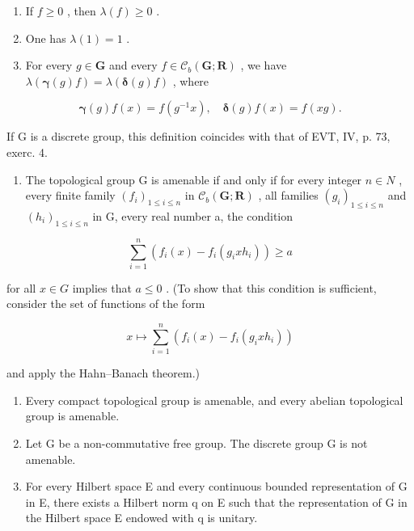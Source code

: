 \begin{enumerate}
\def\labelenumi{(\roman{enumi})}
\item
  If \(f \geqslant 0\) , then \(\lambda(f) \geqslant 0\) .
\item
  One has \(\lambda(1)=1\) .
\item
  For every \(g \in \mathbf{G}\) and every \(f \in \mathcal{C}_b(\mathbf{G};\mathbf{R})\) , we have \(\lambda(\boldsymbol{\gamma}(g)f) = \lambda(\boldsymbol{\delta}(g)f)\) , where
\end{enumerate}

\[
\boldsymbol {\gamma} (g) f (x) = f \left(g ^ {- 1} x\right), \quad \boldsymbol {\delta} (g) f (x) = f (x g).
\]

If G is a discrete group, this definition coincides with that of EVT, IV, p. 73, exerc. 4.

\begin{enumerate}
\def\labelenumi{\alph{enumi})}
\tightlist
\item
  The topological group G is amenable if and only if for every integer \(n \in N\) , every finite family \((f_i)_{1 \leqslant i \leqslant n}\) in \(\mathcal{C}_b(\mathbf{G}; \mathbf{R})\) , all families \((g_i)_{1 \leqslant i \leqslant n}\) and \((h_i)_{1 \leqslant i \leqslant n}\) in G, every real number a, the condition
\end{enumerate}

\[
\sum_ {i = 1} ^ {n} (f _ {i} (x) - f _ {i} (g _ {i} x h _ {i})) \geqslant a
\]

for all \(x \in G\) implies that \(a \leqslant 0\) . (To show that this condition is sufficient, consider the set of functions of the form

\[
x \mapsto \sum_ {i = 1} ^ {n} (f _ {i} (x) - f _ {i} (g _ {i} x h _ {i}))
\]

and apply the Hahn--Banach theorem.)

\begin{enumerate}
\def\labelenumi{\alph{enumi})}
\setcounter{enumi}{1}
\item
  Every compact topological group is amenable, and every abelian topological group is amenable.
\item
  Let G be a non-commutative free group. The discrete group G is not amenable.
\item
  For every Hilbert space E and every continuous bounded representation of G in E, there exists a Hilbert norm q on E such that the representation of G in the Hilbert space E endowed with q is unitary.
\end{enumerate}

